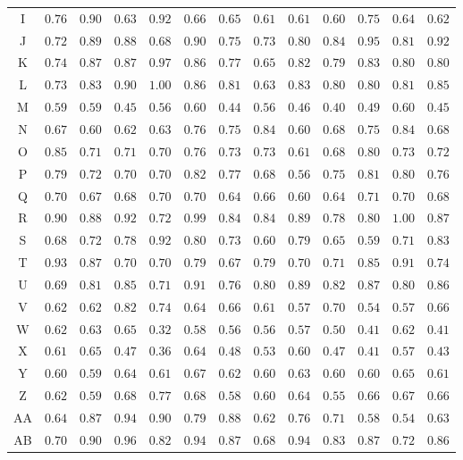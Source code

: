 \begin{table}[b]
{\begin{tabular}{@{}c*{12}{c}@{}}
I & $0.76$ & $0.90$ & $0.63$ & $0.92$ & $0.66$ & $0.65$ & $0.61$ & $0.61$ & $0.60$ & $0.75$ & $0.64$ & $0.62$ \\
J & $0.72$ & $0.89$ & $0.88$ & $0.68$ & $0.90$ & $0.75$ & $0.73$ & $0.80$ & $0.84$ & $0.95$ & $0.81$ & $0.92$ \\
K & $0.74$ & $0.87$ & $0.87$ & $0.97$ & $0.86$ & $0.77$ & $0.65$ & $0.82$ & $0.79$ & $0.83$ & $0.80$ & $0.80$ \\
L & $0.73$ & $0.83$ & $0.90$ & $1.00$ & $0.86$ & $0.81$ & $0.63$ & $0.83$ & $0.80$ & $0.80$ & $0.81$ & $0.85$ \\
M & $0.59$ & $0.59$ & $0.45$ & $0.56$ & $0.60$ & $0.44$ & $0.56$ & $0.46$ & $0.40$ & $0.49$ & $0.60$ & $0.45$ \\
N & $0.67$ & $0.60$ & $0.62$ & $0.63$ & $0.76$ & $0.75$ & $0.84$ & $0.60$ & $0.68$ & $0.75$ & $0.84$ & $0.68$ \\
O & $0.85$ & $0.71$ & $0.71$ & $0.70$ & $0.76$ & $0.73$ & $0.73$ & $0.61$ & $0.68$ & $0.80$ & $0.73$ & $0.72$ \\
P & $0.79$ & $0.72$ & $0.70$ & $0.70$ & $0.82$ & $0.77$ & $0.68$ & $0.56$ & $0.75$ & $0.81$ & $0.80$ & $0.76$ \\
Q & $0.70$ & $0.67$ & $0.68$ & $0.70$ & $0.70$ & $0.64$ & $0.66$ & $0.60$ & $0.64$ & $0.71$ & $0.70$ & $0.68$ \\
R & $0.90$ & $0.88$ & $0.92$ & $0.72$ & $0.99$ & $0.84$ & $0.84$ & $0.89$ & $0.78$ & $0.80$ & $1.00$ & $0.87$ \\
S & $0.68$ & $0.72$ & $0.78$ & $0.92$ & $0.80$ & $0.73$ & $0.60$ & $0.79$ & $0.65$ & $0.59$ & $0.71$ & $0.83$ \\
T & $0.93$ & $0.87$ & $0.70$ & $0.70$ & $0.79$ & $0.67$ & $0.79$ & $0.70$ & $0.71$ & $0.85$ & $0.91$ & $0.74$ \\
U & $0.69$ & $0.81$ & $0.85$ & $0.71$ & $0.91$ & $0.76$ & $0.80$ & $0.89$ & $0.82$ & $0.87$ & $0.80$ & $0.86$ \\
V & $0.62$ & $0.62$ & $0.82$ & $0.74$ & $0.64$ & $0.66$ & $0.61$ & $0.57$ & $0.70$ & $0.54$ & $0.57$ & $0.66$ \\
W & $0.62$ & $0.63$ & $0.65$ & $0.32$ & $0.58$ & $0.56$ & $0.56$ & $0.57$ & $0.50$ & $0.41$ & $0.62$ & $0.41$ \\
X & $0.61$ & $0.65$ & $0.47$ & $0.36$ & $0.64$ & $0.48$ & $0.53$ & $0.60$ & $0.47$ & $0.41$ & $0.57$ & $0.43$ \\
Y & $0.60$ & $0.59$ & $0.64$ & $0.61$ & $0.67$ & $0.62$ & $0.60$ & $0.63$ & $0.60$ & $0.60$ & $0.65$ & $0.61$ \\
Z & $0.62$ & $0.59$ & $0.68$ & $0.77$ & $0.68$ & $0.58$ & $0.60$ & $0.64$ & $0.55$ & $0.66$ & $0.67$ & $0.66$ \\
AA & $0.64$ & $0.87$ & $0.94$ & $0.90$ & $0.79$ & $0.88$ & $0.62$ & $0.76$ & $0.71$ & $0.58$ & $0.54$ & $0.63$ \\
AB & $0.70$ & $0.90$ & $0.96$ & $0.82$ & $0.94$ & $0.87$ & $0.68$ & $0.94$ & $0.83$ & $0.87$ & $0.72$ & $0.86$ \\
    \bottomrule
  \end{tabular}%
  }
\end{table}